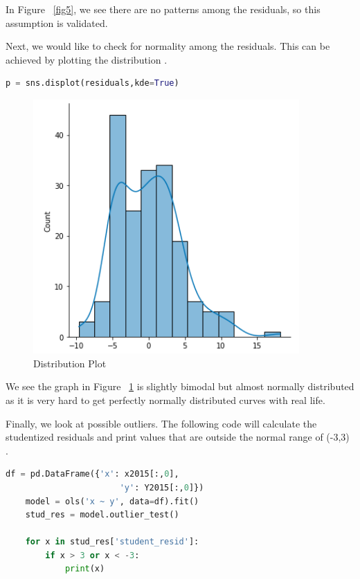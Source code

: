 \documentclass[12pt]{article}
\begin{document}
In Figure ~\ref{fig5}, we see there are no patterns among the residuals, so this assumption is validated.

Next, we would like to check for normality among the residuals. This can be achieved by plotting the distribution \citep{kaggleassumptions}.

\begin{lstlisting}[language=Python]
    p = sns.displot(residuals,kde=True)
\end{lstlisting}

\begin{figure}
    \centering
    \includegraphics[width=4in]{Figures/figure4.png}
    \caption{Distribution Plot}
    \label{fig6}
\end{figure}

We see the graph in Figure ~\ref{fig6} is slightly bimodal but almost normally distributed as it is very hard to get perfectly normally distributed curves with real life.

Finally, we look at possible outliers. The following code will calculate the studentized residuals and print values that are outside the normal range of (-3,3) \citep{statologyresiduals}.

\begin{lstlisting}[language=Python]
    df = pd.DataFrame({'x': x2015[:,0],
                       'y': Y2015[:,0]})
    model = ols('x ~ y', data=df).fit()
    stud_res = model.outlier_test()
    
    for x in stud_res['student_resid']:
        if x > 3 or x < -3:
            print(x)
\end{lstlisting}
\end{document}
